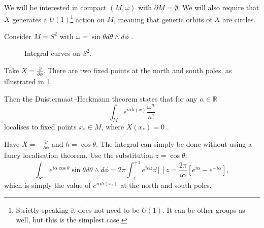We will be interested in compact $(M, \omega)$ with $\partial M = \emptyset$. We will also require that $X$ generates a $U(1)$\footnote{Strictly speaking it does not need to be $U(1)$. It can be other groups as well, but this is the simplest case.} action on $M$, meaning that generic orbits of  $X$  are circles.
\begin{example}[]
  Consider $M = S^2$  with  $\omega = \sin \theta d\theta \wedge d\phi$ .
  \begin{figure}[tbhp]
    \centering
    \def\svgwidth{0.4\columnwidth}
    
    \caption{Integral curves on $S^2$.}
    \label{fig:l4f2}
  \end{figure}
  Take $X = \frac{\partial }{\partial \phi}$. There are two fixed points at the north and south poles, as illustrated in \ref{fig:l4f2}.
\end{example}
Then the Duistermaat--Heckmann theorem states that for any $\alpha \in \mathbb{R}$ 
\begin{equation}
  \int_M e^{i \alpha h(x)} \frac{\omega^n}{n!}
\end{equation}
localises to fixed points $x_* \in M$, where $X(x_*) = 0$ .

\begin{example}[$(M, \omega) = (S^2, \sin \theta d\theta \wedge d\phi)$]
  Have $X = - \frac{\partial }{\partial \phi}$ and $h = \cos \theta$. The integral can simply be done without using a fancy localisation theorem. Use the substitution $z = \cos \theta$:
  \begin{equation}
    \label{eq:4-int}
    \int_{S^2} e^{i \alpha \cos \theta} \sin \theta d\theta \wedge d\phi = 2 \pi \int_{-1}^{+1} e^{i \alpha z} \dd[]{z} = \frac{2 \pi}{i \alpha} \left[ e^{i \alpha} - e^{-i \alpha} \right],
  \end{equation}
  which is simply the value of $e^{i \alpha h(x_*)}$ at the north and south poles.
\end{example}

